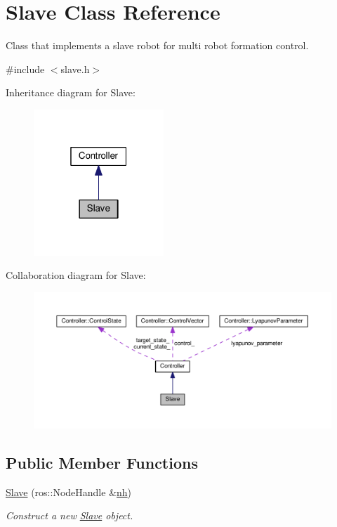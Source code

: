 \hypertarget{classSlave}{}\section{Slave Class Reference}
\label{classSlave}


Class that implements a slave robot for multi robot formation control.  




{\ttfamily \#include $<$slave.\+h$>$}



Inheritance diagram for Slave\+:\nopagebreak
\begin{figure}[H]
\begin{center}
\leavevmode
\includegraphics[width=139pt]{classSlave__inherit__graph}
\end{center}
\end{figure}


Collaboration diagram for Slave\+:\nopagebreak
\begin{figure}[H]
\begin{center}
\leavevmode
\includegraphics[width=350pt]{classSlave__coll__graph}
\end{center}
\end{figure}
\subsection*{Public Member Functions}
\begin{DoxyCompactItemize}
\item 
\hyperlink{classSlave_a855a824b462dd05eddaa8d53b27faea4}{Slave} (ros\+::\+Node\+Handle \&\hyperlink{classController_a24e3d3c2536f6ed29018bad1fd53dae2}{nh})
\begin{DoxyCompactList}\small\item\em Construct a new \hyperlink{classSlave}{Slave} object. \end{DoxyCompactList}\end{DoxyCompactItemize}
